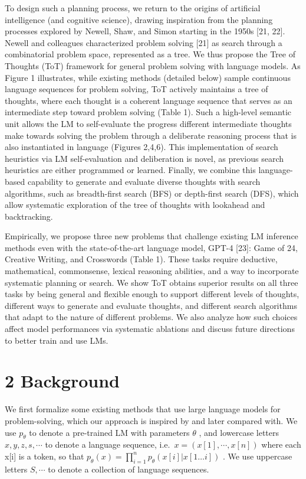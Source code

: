\documentclass[
]{article}
\begin{document}
To design such a planning process, we return to the origins of
artificial intelligence (and cognitive science), drawing inspiration
from the planning processes explored by Newell, Shaw, and Simon starting
in the 1950s {[}21, 22{]}. Newell and colleagues characterized problem
solving {[}21{]} as search through a combinatorial problem space,
represented as a tree. We thus propose the Tree of Thoughts (ToT)
framework for general problem solving with language models. As Figure 1
illustrates, while existing methods (detailed below) sample continuous
language sequences for problem solving, ToT actively maintains a tree of
thoughts, where each thought is a coherent language sequence that serves
as an intermediate step toward problem solving (Table 1). Such a
high-level semantic unit allows the LM to self-evaluate the progress
different intermediate thoughts make towards solving the problem through
a deliberate reasoning process that is also instantiated in language
(Figures 2,4,6). This implementation of search heuristics via LM
self-evaluation and deliberation is novel, as previous search heuristics
are either programmed or learned. Finally, we combine this
language-based capability to generate and evaluate diverse thoughts with
search algorithms, such as breadth-first search (BFS) or depth-first
search (DFS), which allow systematic exploration of the tree of thoughts
with lookahead and backtracking.

Empirically, we propose three new problems that challenge existing LM
inference methods even with the state-of-the-art language model, GPT-4
{[}23{]}: Game of 24, Creative Writing, and Crosswords (Table 1). These
tasks require deductive, mathematical, commonsense, lexical reasoning
abilities, and a way to incorporate systematic planning or search. We
show ToT obtains superior results on all three tasks by being general
and flexible enough to support different levels of thoughts, different
ways to generate and evaluate thoughts, and different search algorithms
that adapt to the nature of different problems. We also analyze how such
choices affect model performances via systematic ablations and discuss
future directions to better train and use LMs.

\section{2 Background}\label{background}

We first formalize some existing methods that use large language models
for problem-solving, which our approach is inspired by and later
compared with. We use \(p_{\theta}\) to denote a pre-trained LM with
parameters \(\theta\) , and lowercase letters \(x, y, z, s, \cdots\) to
denote a language sequence, i.e.~\(x = (x[1], \cdots, x[n])\) where each
x{[}i{]} is a token, so that
\(p_{\theta}(x) = \prod_{i=1}^{n} p_{\theta}(x[i] | x[1 \ldots i])\) .
We use uppercase letters \(S, \cdots\) to denote a collection of
language sequences.
\end{document}
